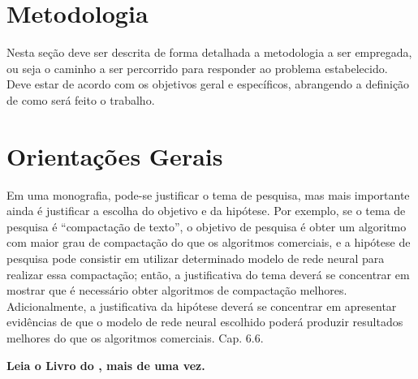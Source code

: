 \documentclass[a4paper,12pt]{article}
\begin{document}
\section{Metodologia}
\label{sc:metodologia}
Nesta seção deve ser descrita de forma detalhada a metodologia a ser empregada, ou seja  o caminho a ser percorrido para responder ao problema estabelecido. Deve estar de acordo com os
objetivos geral e específicos, abrangendo a definição de como será feito o trabalho.



%

%



\newpage
\section{Orientações Gerais}

Em uma monografia, pode-se justificar o tema de pesquisa, mas mais importante ainda é justificar a escolha do objetivo e da hipótese. Por exemplo, se o tema de pesquisa é “compactação de texto”, o objetivo de pesquisa é obter um algoritmo com maior grau de compactação do que os algoritmos comerciais, e a hipótese de pesquisa pode consistir em utilizar determinado modelo de rede neural para realizar essa compactação; então, a justificativa do tema deverá se concentrar em mostrar que é necessário obter algoritmos de compactação melhores. Adicionalmente, a justificativa da hipótese deverá se concentrar em apresentar evidências de que o modelo de rede neural escolhido poderá produzir resultados melhores do que os algoritmos comerciais. \cite{wazlawick2017metodologia} Cap. 6.6. 

\textbf{Leia o Livro do \cite{wazlawick2017metodologia}, mais de uma vez.}


%

\end{document}
